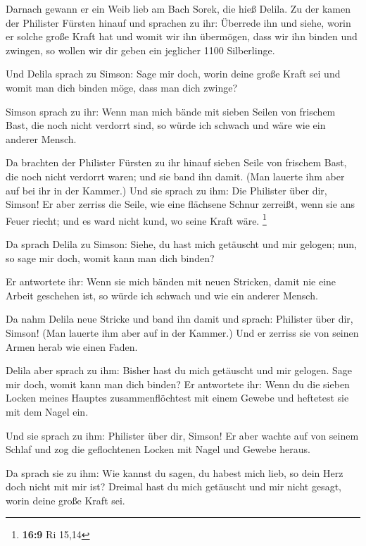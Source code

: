  Darnach gewann er ein Weib lieb am Bach Sorek, die hieß
Delila.  Zu der kamen der Philister Fürsten hinauf und
sprachen zu ihr: Überrede ihn und siehe, worin er solche große Kraft hat
und womit wir ihn übermögen, dass wir ihn binden und zwingen, so wollen
wir dir geben ein jeglicher 1100 Silberlinge.

 Und Delila sprach zu Simson: Sage mir doch, worin deine
große Kraft sei und womit man dich binden möge, dass man dich zwinge?

 Simson sprach zu ihr: Wenn man mich bände mit sieben Seilen
von frischem Bast, die noch nicht verdorrt sind, so würde ich schwach
und wäre wie ein anderer Mensch.

 Da brachten der Philister Fürsten zu ihr hinauf sieben
Seile von frischem Bast, die noch nicht verdorrt waren; und sie band ihn
damit.  (Man lauerte ihm aber auf bei ihr in der Kammer.)
Und sie sprach zu ihm: Die Philister über dir, Simson! Er aber zerriss
die Seile, wie eine flächsene Schnur zerreißt, wenn sie ans Feuer
riecht; und es ward nicht kund, wo seine Kraft wäre. \footnote{\textbf{16:9}
  Ri 15,14}

 Da sprach Delila zu Simson: Siehe, du hast mich getäuscht
und mir gelogen; nun, so sage mir doch, womit kann man dich binden?

 Er antwortete ihr: Wenn sie mich bänden mit neuen
Stricken, damit nie eine Arbeit geschehen ist, so würde ich schwach und
wie ein anderer Mensch.

 Da nahm Delila neue Stricke und band ihn damit und sprach:
Philister über dir, Simson! (Man lauerte ihm aber auf in der Kammer.)
Und er zerriss sie von seinen Armen herab wie einen Faden.

 Delila aber sprach zu ihm: Bisher hast du mich getäuscht
und mir gelogen. Sage mir doch, womit kann man dich binden? Er
antwortete ihr: Wenn du die sieben Locken meines Hauptes
zusammenflöchtest mit einem Gewebe und heftetest sie mit dem Nagel ein.

 Und sie sprach zu ihm: Philister über dir, Simson! Er aber
wachte auf von seinem Schlaf und zog die geflochtenen Locken mit Nagel
und Gewebe heraus.

 Da sprach sie zu ihm: Wie kannst du sagen, du habest mich
lieb, so dein Herz doch nicht mit mir ist? Dreimal hast du mich
getäuscht und mir nicht gesagt, worin deine große Kraft sei.

